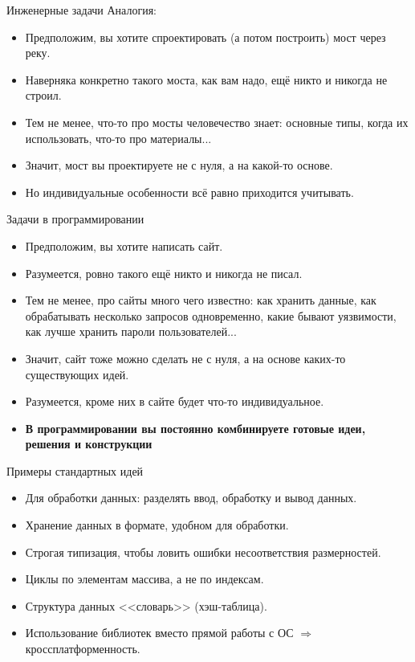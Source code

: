 \begin{frame}{Инженерные задачи}
	Аналогия:
	\begin{itemize}
		\item Предположим, вы хотите спроектировать (а потом построить) мост через реку.
		\item Наверняка конкретно такого моста, как вам надо, ещё никто и никогда не строил.
		\item Тем не менее, что-то про мосты человечество знает: основные типы, когда их использовать, что-то про материалы...
		\item Значит, мост вы проектируете не с нуля, а на какой-то основе.
		\item Но индивидуальные особенности всё равно приходится учитывать.
	\end{itemize}
\end{frame}

\begin{frame}{Задачи в программировании}
	\begin{itemize}
		\item Предположим, вы хотите написать сайт.
		\item Разумеется, ровно такого ещё никто и никогда не писал.
		\item
			Тем не менее, про сайты много чего известно: как хранить данные,
			как обрабатывать несколько запросов одновременно, какие бывают уязвимости, как лучше хранить пароли пользователей...
		\item Значит, сайт тоже можно сделать не с нуля, а на основе каких-то существующих идей.
		\item Разумеется, кроме них в сайте будет что-то индивидуальное.
		\item \textbf{В программировании вы постоянно комбинируете готовые идеи, решения и конструкции}
	\end{itemize}
\end{frame}

\begin{frame}{Примеры стандартных идей}
	\begin{itemize}
		\item Для обработки данных: разделять ввод, обработку и вывод данных.
		\item Хранение данных в формате, удобном для обработки.
		\item Строгая типизация, чтобы ловить ошибки несоответствия размерностей.
		\item Циклы по элементам массива, а не по индексам.
		\item Структура данных <<словарь>> (хэш-таблица).
		\item Использование библиотек вместо прямой работы с ОС $\Rightarrow$ кроссплатформенность.
	\end{itemize}
\end{frame}
